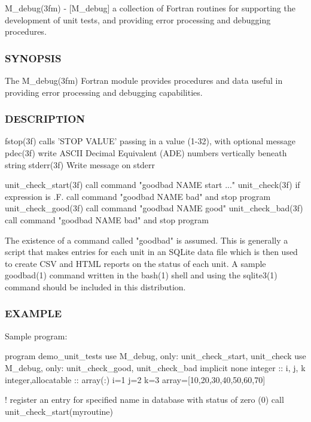 M\+\_\+debug(3fm) -\/ \mbox{[}M\+\_\+debug\mbox{]} a collection of Fortran routines for supporting the development of unit tests, and providing error processing and debugging procedures. \subsubsection*{S\+Y\+N\+O\+P\+S\+IS}

The M\+\_\+debug(3fm) Fortran module provides procedures and data useful in providing error processing and debugging capabilities. \subsubsection*{D\+E\+S\+C\+R\+I\+P\+T\+I\+ON}

\begin{DoxyVerb}fstop(3f)             calls 'STOP VALUE' passing in a value (1-32), with optional message
pdec(3f)              write ASCII Decimal Equivalent (ADE) numbers vertically beneath string
stderr(3f)            Write message on stderr

unit_check_start(3f)  call command "goodbad NAME start ..."
unit_check(3f)        if expression is .F. call command "goodbad NAME bad" and stop program
unit_check_good(3f)   call command "goodbad NAME good"
unit_check_bad(3f)    call command "goodbad NAME bad" and  stop program

The existence of a command called "goodbad" is assumed. This is generally a script that makes entries for each unit in an
SQLite data file which is then used to create CSV and HTML reports on the status of each unit. A sample goodbad(1) command
written in the bash(1) shell and using the sqlite3(1) command should be included in this distribution.
\end{DoxyVerb}


\subsubsection*{E\+X\+A\+M\+P\+LE}

Sample program\+:

program demo\+\_\+unit\+\_\+tests use M\+\_\+debug, only\+: unit\+\_\+check\+\_\+start, unit\+\_\+check use M\+\_\+debug, only\+: unit\+\_\+check\+\_\+good, unit\+\_\+check\+\_\+bad implicit none integer \+:\+: i, j, k integer,allocatable \+:\+: array(\+:) i=1 j=2 k=3 array=\mbox{[}10,20,30,40,50,60,70\mbox{]}

! register an entry for specified name in database with status of zero (0) call unit\+\_\+check\+\_\+start(\textquotesingle{}myroutine\textquotesingle{})

